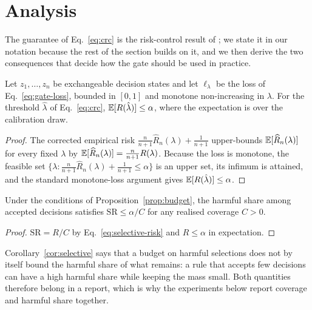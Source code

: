 \section{Analysis}
\label{sec:analysis}

The guarantee of Eq.~\eqref{eq:crc} is the risk-control result of
\citet{angelopoulos2023conformal}; we state it in our notation because the rest
of the section builds on it, and we then derive the two consequences that
decide how the gate should be used in practice.

\begin{proposition}
\label{prop:budget}
Let $z_1,\ldots,z_n$ be exchangeable decision states and let
$\ell_\lambda$ be the loss of Eq.~\eqref{eq:gate-loss}, bounded in $[0,1]$ and
monotone non-increasing in $\lambda$. For the threshold $\hat\lambda$ of
Eq.~\eqref{eq:crc}, $\mathbb{E}[R(\hat\lambda)]\le\alpha$, where the expectation is
over the calibration draw.
\end{proposition}

\begin{proof}
The corrected empirical risk
$\frac{n}{n+1}\widehat R_n(\lambda)+\frac1{n+1}$ upper-bounds
$\mathbb{E}[\widehat R_n(\lambda)]$ for every fixed $\lambda$ by
$\mathbb{E}[\widehat R_n(\lambda)]=\frac{n}{n+1}R(\lambda)$. Because the loss is
monotone, the feasible set $\{\lambda:\frac{n}{n+1}\widehat R_n(\lambda)+
\frac1{n+1}\le\alpha\}$ is an upper set, its infimum is attained, and the
standard monotone-loss argument gives $\mathbb{E}[R(\hat\lambda)]\le\alpha$.
\end{proof}

\begin{corollary}
\label{cor:selective}
Under the conditions of Proposition~\ref{prop:budget}, the harmful share among
accepted decisions satisfies $\mathrm{SR}\le\alpha/C$ for any realised
coverage $C>0$.
\end{corollary}

\begin{proof}
$\mathrm{SR}=R/C$ by Eq.~\eqref{eq:selective-risk} and $R\le\alpha$ in
expectation.
\end{proof}

Corollary~\ref{cor:selective} says that a budget on harmful selections does not
by itself bound the harmful share of what remains: a rule that accepts few
decisions can have a high harmful share while keeping the mass small. Both
quantities therefore belong in a report, which is why the experiments below
report coverage and harmful share together.

